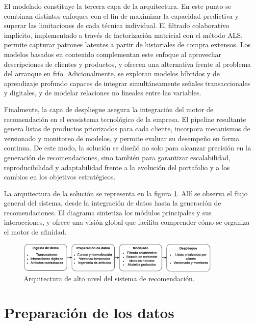 El modelado constituye la tercera capa de la arquitectura. En este punto se combinan distintos enfoques con el fin de maximizar la capacidad predictiva y superar las limitaciones de cada técnica individual. El filtrado colaborativo implícito, implementado a través de factorización matricial con el método ALS, permite capturar patrones latentes a partir de historiales de compra extensos. Los modelos basados en contenido complementan este enfoque al aprovechar descripciones de clientes y productos, y ofrecen una alternativa frente al problema del arranque en frío. Adicionalmente, se exploran modelos híbridos y de aprendizaje profundo capaces de integrar simultáneamente señales transaccionales y digitales, y de modelar relaciones no lineales entre las variables.

Finalmente, la capa de despliegue asegura la integración del motor de recomendación en el ecosistema tecnológico de la empresa. El pipeline resultante genera listas de productos priorizados para cada cliente, incorpora mecanismos de versionado y monitoreo de modelos, y permite evaluar su desempeño en forma continua. De este modo, la solución se diseñó no solo para alcanzar precisión en la generación de recomendaciones, sino también para garantizar escalabilidad, reproducibilidad y adaptabilidad frente a la evolución del portafolio y a los cambios en los objetivos estratégicos.

La arquitectura de la solución se representa en la figura \ref{fig:arquitectura}. Allí se observa el flujo general del sistema, desde la integración de datos hasta la generación de recomendaciones. El diagrama sintetiza los módulos principales y sus interacciones, y ofrece una visión global que facilita comprender cómo se organiza el motor de afinidad.

\begin{figure}[H]
  \centering
  \includegraphics[width=0.9\textwidth]{Figures/Arquitectura.png}
  \caption{Arquitectura de alto nivel del sistema de recomendación.}
  \label{fig:arquitectura}
\end{figure}


\section{Preparación de los datos}

